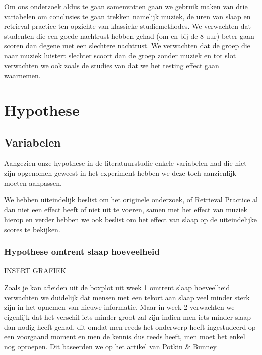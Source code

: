 \documentclass{hogent-article}
\begin{document}
\par
\noindent
Om ons onderzoek aldus te gaan samenvatten gaan we gebruik maken van drie variabelen om conclusies te gaan trekken namelijk muziek, de uren van slaap en retrieval practice ten opzichte van klassieke studiemethodes. We verwachten dat studenten die een goede nachtrust hebben gehad (om en bij de 8 uur) beter gaan scoren dan degene met een slechtere nachtrust. We verwachten dat de groep die naar muziek luistert slechter scoort dan de groep zonder muziek en tot slot verwachten we ook zoals de studies van \textcite{Roediger2006} dat we het testing effect gaan waarnemen.





\section{Hypothese}

\subsection{Variabelen}

Aangezien onze hypothese in de literatuurstudie enkele variabelen had die niet zijn opgenomen geweest in het experiment hebben we deze toch aanzienlijk moeten aanpassen.
\\
\par
\noindent
We hebben uiteindelijk beslist om het originele onderzoek, of Retrieval Practice al dan niet een effect heeft of niet uit te voeren, samen met het effect van muziek hierop en verder hebben we ook beslist om het effect van slaap op de uiteindelijke scores te bekijken.

\subsubsection{Hypothese omtrent slaap hoeveelheid}

INSERT GRAFIEK

Zoals je kan afleiden uit de boxplot uit week 1 omtrent slaap hoeveelheid verwachten we duidelijk dat mensen met een tekort aan slaap veel minder sterk zijn in het opnemen van nieuwe informatie. Maar in week 2 verwachten we eigenlijk dat het verschil iets minder groot zal zijn indien men iets minder slaap dan nodig heeft gehad, dit omdat men reeds het onderwerp heeft ingestudeerd op een voorgaand moment en men de kennis dus reeds heeft, men moet het enkel nog oproepen. Dit baseerden we op het artikel van Potkin \& Bunney
\end{document}
